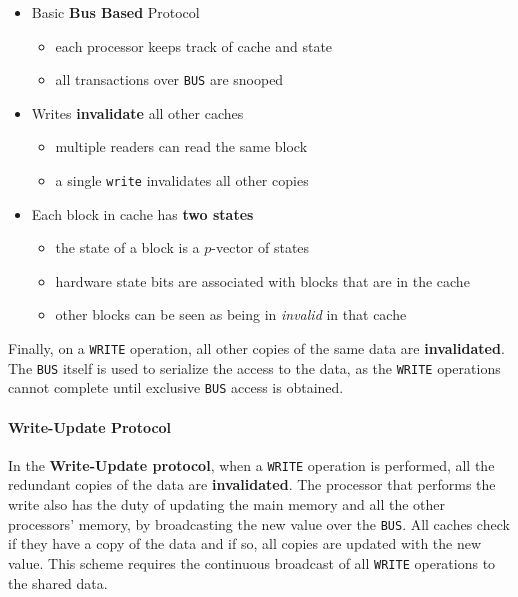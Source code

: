 \documentclass[english]{article}
\begin{document}
\begin{itemize}
  \item Basic \textbf{Bus Based} Protocol
        \begin{itemize}
          \item each processor keeps track of cache and state
          \item all transactions over \texttt{BUS} are snooped
        \end{itemize}
  \item Writes \textbf{invalidate} all other caches
        \begin{itemize}
          \item multiple readers can read the same block
          \item a single \texttt{write} invalidates all other copies
        \end{itemize}
  \item Each block in cache has \textbf{two states}
        \begin{itemize}
          \item the state of a block is a \(p\)-vector of states
          \item hardware state bits are associated with blocks that are in the cache
          \item other blocks can be seen as being in \textit{invalid} in that cache
        \end{itemize}
\end{itemize}

Finally, on a \texttt{WRITE} operation, all other copies of the same data are \textbf{invalidated}.
The \texttt{BUS} itself is used to serialize the access to the data, as the \texttt{WRITE} operations cannot complete until exclusive \texttt{BUS} access is obtained.

\paragraph{Write-Update Protocol}

In the \textbf{Write-Update protocol}, when a \texttt{WRITE} operation is performed, all the redundant copies of the data are \textbf{invalidated}.
The processor that performs the write also has the duty of updating the main memory and all the other processors' memory, by broadcasting the new value over the \texttt{BUS}.
All caches check if they have a copy of the data and if so, all copies are updated with the new value.
This scheme requires the continuous broadcast of all \texttt{WRITE} operations to the shared data.
\end{document}
